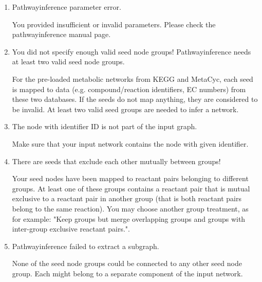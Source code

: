 \begin{enumerate}

\item Pathwayinference parameter error.

	You provided insufficient or invalid parameters. Please check the pathwayinference manual page.

\item You did not specify enough valid seed node groups! Pathwayinference needs at least two valid seed node groups.

	For the pre-loaded metabolic networks from KEGG and MetaCyc, each seed
	is mapped to data (e.g. compound/reaction identifiers, EC numbers) from these two databases.
	If the seeds do not map anything, they are considered to be invalid.
	At least two valid seed groups are needed to infer a network.

\item The node with identifier ID is not part of the input graph.

	Make sure that your input network contains the node with given identifier.

\item There are seeds that exclude each other mutually between groups!

	Your seed nodes have been mapped to reactant pairs belonging to different groups. At least one of these groups contains
	a reactant pair that is mutual exclusive to a reactant pair in another group (that is both reactant pairs belong to the
	same reaction). You may choose another group treatment, as for example:
	"Keep groups but merge overlapping groups and groups with inter-group exclusive reactant pairs.".

\item Pathwayinference failed to extract a subgraph.

    None of the seed node groups could be connected to any other seed node group. Each might belong to a
    separate component of the input network.

\end{enumerate}